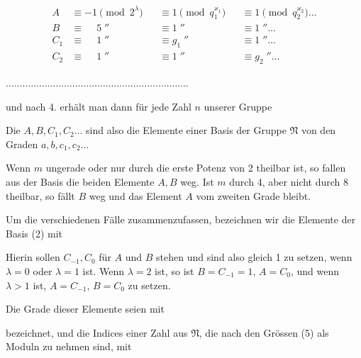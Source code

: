 \[
\begin{aligned}
A &\equiv -1 \pmod{2^{\lambda}} &&\equiv 1 \pmod{q_1^{\varkappa_1}} &&\equiv 1 \pmod{q_2^{\varkappa_2}} \ldots\\
B &\equiv \phantom{-}5\;'' &&\equiv 1\;'' &&\equiv 1\;'' \ldots\\
C_1 &\equiv \phantom{-}1\;'' &&\equiv g_1\;'' &&\equiv 1\;'' \ldots\\
C_2 &\equiv \phantom{-}1\;'' &&\equiv 1\;'' &&\equiv g_2\;'' \ldots
\end{aligned}
\]

\noindent
$\ldots\ldots\ldots\ldots\ldots\ldots\ldots\ldots\ldots\ldots\ldots\ldots\ldots\ldots\ldots\ldots\ldots\ldots\ldots\ldots\ldots\ldots$

und nach 4. erh\"alt man dann f\"ur jede Zahl $n$ unserer Gruppe


Die $A, B, C_1, C_2 \ldots$ sind also die Elemente einer Basis der
Gruppe $\mathfrak{N}$ von den Graden $a, b, c_1, c_2 \ldots$

Wenn $m$ ungerade oder nur durch die erste Potenz von 2
theilbar ist, so fallen aus der Basis die beiden Elemente $A, B$
weg. Ist $m$ durch 4, aber nicht durch 8 theilbar, so f\"allt $B$ weg
und das Element $A$ vom zweiten Grade bleibt.


Um die verschiedenen F\"alle zusammenzufassen, bezeichnen
wir die Elemente der Basis (2) mit


Hierin sollen $C_{-1}, C_0$ f\"ur $A$ und $B$ stehen und sind also
gleich 1 zu setzen, wenn $\lambda = 0$ oder $\lambda = 1$ ist. Wenn $\lambda = 2$
ist, so ist $B = C_{-1} = 1$, $A = C_0$, und wenn $\lambda > 1$ ist, $A = C_{-1}$,
$B = C_0$ zu setzen.

Die Grade dieser Elemente seien mit


bezeichnet, und die Indices einer Zahl aus $\mathfrak{N}$, die nach den
Gr\"ossen (5) als Moduln zu nehmen sind, mit

